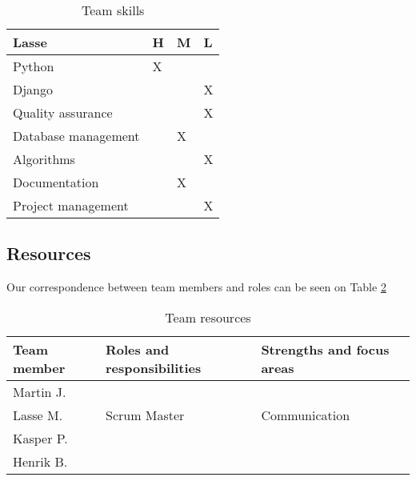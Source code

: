 \begin{table}[!ht]
{        \centering
        \small
        \begin{tabular}{l|l|l|l}
            \rowcolor{Gray}
            \textbf{Lasse} & \textbf{H} & \textbf{M} & \textbf{L}\\\hline
             Python & X & &\\
             Django & & & X\\
             Quality assurance & & & X\\
             Database management & & X &\\
             Algorithms & & & X\\
             Documentation & & X &\\
             Project management & & & X
        \end{tabular}
        }%
    \caption{Team skills}
    \label{tab:skills}
\end{table}

\subsection{Resources}
Our correspondence between team members and roles can be seen on Table 
\ref{tab:resources}


\begin{table}[!ht]
    \centering
    \begin{tabular}{l|l|l}
        \rowcolor{Gray}
        \textbf{Team member} & \textbf{Roles and responsibilities} & \textbf{Strengths and focus areas}\\\hline
        Martin J.            &&\\
        Lasse M.             & Scrum Master & Communication\\
        Kasper P.            & &\\
        Henrik B.            & &
    \end{tabular}
    \caption{Team resources}
    \label{tab:resources}
\end{table}

